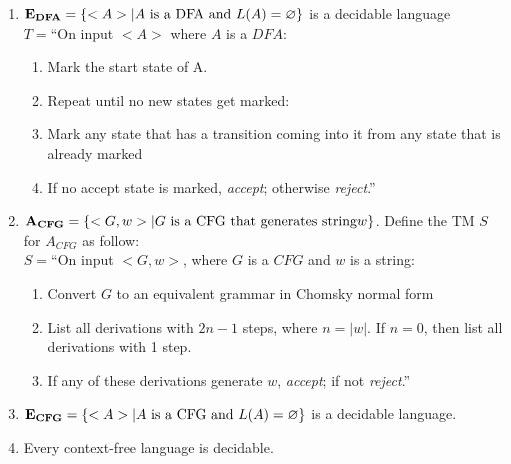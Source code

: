 \documentclass[a4paper]{article}
\begin{document}
\begin{enumerate}[{\bf (a)}]
    \item  ${\bf E_{DFA}}= \left\{ <A> | A \text{ is a DFA and }L(A)=\varnothing \right\}$ is a decidable language\\ 
      $T=$``On input $<A>$ where $A$ is a $DFA$:
      \begin{enumerate}[1.]
        \item Mark the start state of A.
        \item Repeat until no new states get marked:
        \item Mark any state that has a transition coming into it from any state that is already marked
        \item If no accept state is marked, \emph{accept}; otherwise \emph{reject}.''
      \end{enumerate}

    \item ${\bf A_{CFG}}=\left\{ <G,w>|G \text{ is a CFG that generates string} w \right\}$. Define the TM $S$ for $A_{CFG}$ as follow: \\
      $S=$``On input $<G,w>$, where $G$ is a $CFG$ and $w$ is a string:
      \begin{enumerate}[1.]
        \item Convert $G$ to an equivalent grammar in Chomsky normal form
        \item List all derivations with $2n-1$ steps, where $n=|w|$. If $n=0$, then list all derivations with 1 step.
        \item If any of these derivations generate $w$, \emph{accept}; if not \emph{reject}.''
      \end{enumerate}

    \item  ${\bf E_{CFG}}= \left\{ <A> | A \text{ is a CFG and }L(A)=\varnothing \right\}$ is a decidable language. \\
    \item Every context-free language is decidable.
\end{enumerate}
\end{document}
